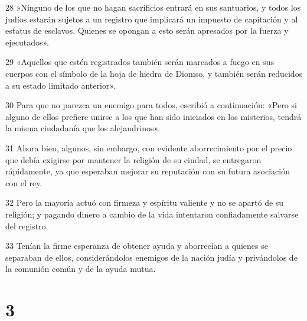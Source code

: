 \par 28 »Ninguno de los que no hagan sacrificios entrará en sus santuarios, y todos los judíos estarán sujetos a un registro que implicará un impuesto de capitación y al estatus de esclavos. Quienes se opongan a esto serán apresados ​​por la fuerza y ​​ejecutados».
\par 29 «Aquellos que estén registrados también serán marcados a fuego en sus cuerpos con el símbolo de la hoja de hiedra de Dioniso, y también serán reducidos a su estado limitado anterior».
\par 30 Para que no parezca un enemigo para todos, escribió a continuación: «Pero si alguno de ellos prefiere unirse a los que han sido iniciados en los misterios, tendrá la misma ciudadanía que los alejandrinos».
\par 31 Ahora bien, algunos, sin embargo, con evidente aborrecimiento por el precio que debía exigirse por mantener la religión de su ciudad, se entregaron rápidamente, ya que esperaban mejorar su reputación con su futura asociación con el rey.
\par 32 Pero la mayoría actuó con firmeza y espíritu valiente y no se apartó de su religión; y pagando dinero a cambio de la vida intentaron confiadamente salvarse del registro.
\par 33 Tenían la firme esperanza de obtener ayuda y aborrecían a quienes se separaban de ellos, considerándolos enemigos de la nación judía y privándolos de la comunión común y de la ayuda mutua.

\chapter{3}

